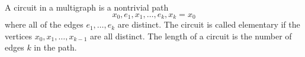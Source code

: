A circuit in a multigraph is a nontrivial path
$$x_0, e_1, x_1, \ldots, e_k, x_k = x_0$$
where all of the edges $e_1, \ldots, e_k$ are distinct. The circuit is called elementary if the vertices $x_0, x_1, \ldots, x_{k-1}$ are all distinct. The length of a circuit is the number of edges $k$ in the path.
